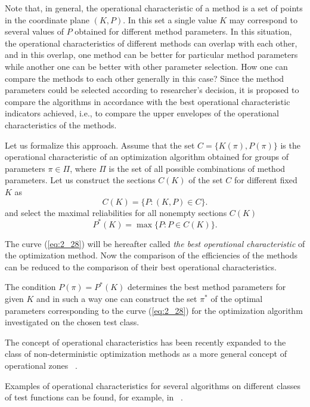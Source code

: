 Note that, in general, the operational characteristic of a method is a set of points in the coordinate plane $(K, P)$. In this set a single value $K$ may correspond to several values of $P$ obtained for different method parameters. In this situation, the operational characteristics of different methods can overlap with each other, and in this overlap, one method can be better for particular method parameters while another one can be better with other parameter selection. How one can compare the methods to each other generally in this case? Since the method parameters could be selected according to researcher’s decision, it is proposed to compare the algorithms in accordance with the best operational characteristic indicators achieved, i.e., to compare the upper envelopes of the operational characteristics of the methods. 

Let us formalize this approach. Assume that the set $C=\{K(\pi),P(\pi)\}$ is the operational characteristic of an optimization algorithm obtained for groups of parameters $\pi\in\Pi$, where  $\Pi$  is the set of all possible combinations of method parameters. Let us construct the sections $C(K)$ of the set $C$ for different fixed $K$ as
\begin{displaymath}
C(K)=\{P:(K,P)\in C\}.
\end{displaymath}
and select the maximal reliabilities for all nonempty sections $C(K)$ 
\begin{equation}
\label{eq:2_28}
P^*(K)=\max \{P:P\in C(K)\}.
\end{equation}

The curve (\ref{eq:2_28}) will be hereafter called \textit{the best operational characteristic} of the optimization method. Now the comparison of the efficiencies of the methods can be reduced to the comparison of their best operational characteristics.
     
The condition $P(\pi)=P^*(K)$  determines the best method parameters for given $K$ and in such a way one can construct the set  $\pi^*$ of the optimal parameters  corresponding to the curve (\ref{eq:2_28}) for the optimization algorithm investigated on the chosen test class.

The concept of operational characteristics has been recently expanded to the class of non-deterministic optimization methods as a more general concept of operational zones ~\cite{2_SergKvasMukhOZ}.

Examples of operational characteristics for several algorithms  on different classes of test functions can be found, for example, in ~\cite{2_GerGriIsr, 2_GerGriGer, 2_GrishaginOperChar, 2_GriIsrSergAMC, 2_StrMonRus, 2_StrSergMon2000}.

